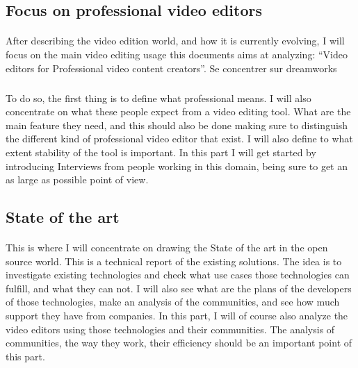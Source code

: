     \subsection*{Focus on professional video editors}
        \paragraph{}
            After describing the video edition world, and how it is currently
            evolving, I will focus on the main video editing usage this documents
            aims at analyzing: ``Video editors for Professional video content
            creators''. Se concentrer sur dreamworks \cite{RobinRowe2001}

       \subparagraph{}
            To do so, the first thing is to define what professional means. I will
            also concentrate on what these people expect from a video editing tool.
            What are the main feature they need, and this should also be done
            making sure to distinguish the different kind of professional video
            editor that exist. I will also define to what extent stability of the
            tool is important. In this part I will get started by introducing
            Interviews from people working in this domain, being sure to get an
            as large as possible point of view.

    \subsection*{State of the art}
       \paragraph{}
            This is where I will concentrate on drawing the State of the art in
            the open source world. This is a  technical report of the existing
            solutions.  The idea is to investigate existing technologies and
            check what use cases those technologies can fulfill, and what they
            can not. I will also see what are the plans of the developers of
            those technologies, make an analysis of the communities, and see
            how much support they have from companies. In this part, I will of
            course also analyze the video editors using those technologies and
            their communities. The analysis of communities, the way they work,
            their efficiency should be an important point of this part.

